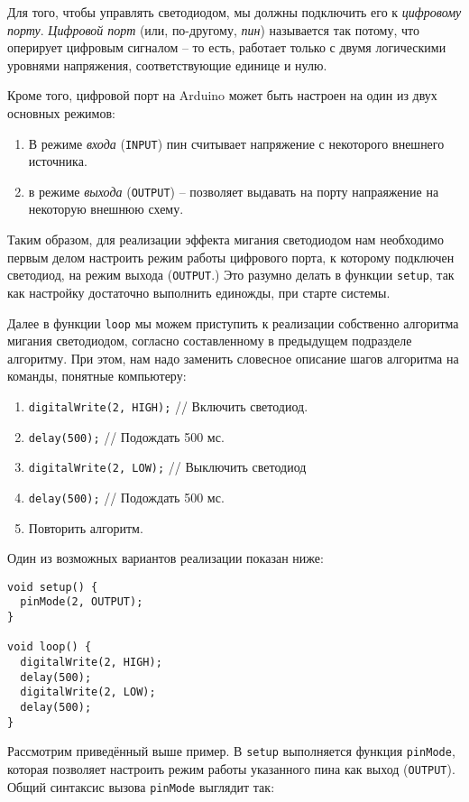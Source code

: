 \documentclass[../sparc.tex]{subfiles}
\begin{document}
Для того, чтобы управлять светодиодом, мы должны подключить его к
\emph{цифровому порту}.  \emph{Цифровой порт} (или, по-другому, \emph{пин})
называется так потому, что оперирует цифровым сигналом -- то есть, работает
только с двумя логическими уровнями напряжения, соответствующие единице и нулю.

Кроме того, цифровой порт на Arduino может быть настроен на один из двух
основных режимов:
\begin{enumerate}
\item В режиме \emph{входа} (\texttt{INPUT}) пин считывает напряжение с
  некоторого внешнего источника.
\item в режиме \emph{выхода} (\texttt{OUTPUT}) – позволяет выдавать на порту
  напраяжение на некоторую внешнюю схему.
\end{enumerate}

Таким образом, для реализации эффекта мигания светодиодом нам необходимо первым
делом настроить режим работы цифрового порта, к которому подключен светодиод, на
режим выхода (\texttt{OUTPUT}.)  Это разумно делать в функции \texttt{setup},
так как настройку достаточно выполнить единожды, при старте системы.

Далее в функции \texttt{loop} мы можем приступить к реализации собственно
алгоритма мигания светодиодом, согласно составленному в предыдущем подразделе
алгоритму.  При этом, нам надо заменить словесное описание шагов алгоритма на
команды, понятные компьютеру:

\begin{enumerate}
\item \texttt{digitalWrite(2, HIGH);} // Включить светодиод.
\item \texttt{delay(500);} // Подождать 500 мс.
\item \texttt{digitalWrite(2, LOW);} // Выключить светодиод
\item \texttt{delay(500);} // Подождать 500 мс.
\item Повторить алгоритм.
\end{enumerate}

Один из возможных вариантов реализации показан ниже:

\begin{verbatim}
void setup() {
  pinMode(2, OUTPUT);
}

void loop() {
  digitalWrite(2, HIGH);
  delay(500);
  digitalWrite(2, LOW);
  delay(500);
}
\end{verbatim}

Рассмотрим приведённый выше пример.  В \texttt{setup} выполняется функция
\texttt{pinMode}, которая позволяет настроить режим работы указанного пина как
выход (\texttt{OUTPUT}).  Общий синтаксис вызова \texttt{pinMode} выглядит так:
\end{document}
